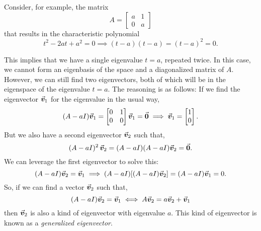 \documentclass[../MathsNotesBase.tex]{subfiles}
\begin{document}
{		Consider, for example, the matrix
		\[
			A = \begin{bmatrix}
					a & 1\\
					0 & a
				\end{bmatrix} 
		\]
		that results in the characteristic polynomial
		\[ t^2 - 2at + a^2 = 0 \implies (t - a)(t - a) = (t - a)^2 = 0. \]
		
		This implies that we have a single eigenvalue ${ t = a }$, repeated twice. In this case, we cannot form an eigenbasis of the space and a diagonalized matrix of $A$. However, we can still find two eigenvectors, both of which will be in the eigenspace of the eigenvalue ${ t = a }$. The reasoning is as follows: If we find the eigenvector $\vec{\bm{v}}_1$ for the eigenvalue in the usual way,
		\[ (A - aI)\vec{\bm{v}}_1 = 
			\begin{bmatrix}
				0 & 1\\
				0 & 0
			\end{bmatrix}\vec{\bm{v}}_1 = \vec{\bm{0}} \implies \vec{\bm{v}}_1 = \begin{bmatrix}1\\ 0\end{bmatrix}. 
		\]
		But we also have a second eigenvector $\vec{\bm{v}}_2$ such that,
		\[ (A - aI)^2 \,\vec{\bm{v}}_2 = (A - aI)(A - aI)\vec{\bm{v}}_2 = \vec{\bm{0}}. \]
		We can leverage the first eigenvector to solve this:
		\[ (A - aI)\vec{\bm{v}}_2 = \vec{\bm{v}}_1 \implies (A - aI)[(A - aI)\vec{\bm{v}}_2] = (A - aI)\vec{\bm{v}}_1 = 0. \]
		So, if we can find a vector $\vec{\bm{v}}_2$ such that,
		\[ (A - aI)\vec{\bm{v}}_2 = \vec{\bm{v}}_1 \iff A\vec{\bm{v}}_2 = a\vec{\bm{v}}_2 + \vec{\bm{v}}_1 \]
		then $\vec{\bm{v}}_2$ is also a kind of eigenvector with eigenvalue $a$. This kind of eigenvector is known as a \textit{generalized eigenvector}.\\
		
}
\end{document}
